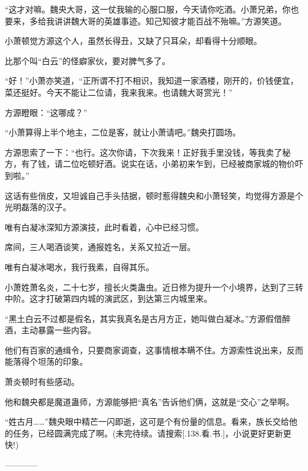 \begin{this_body}
“这才对嘛。魏央大哥，这一仗我输的心服口服，今天请你吃酒。小萧兄弟，你也要来，多给我讲讲魏大哥的英雄事迹。知己知彼才能百战不殆嘛。”方源笑道。

小萧顿觉方源这个人，虽然长得丑，又缺了只耳朵，却看得十分顺眼。

比那个叫“白云”的怪癖家伙，要对脾气多了。

“好！”小萧亦笑道，“正所谓不打不相识，我知道一家酒楼，刚开的，价钱便宜，菜还挺好。今天不能让二位请，我来我来。也请魏大哥赏光！”

方源瞪眼：“这哪成？”

“小萧算得上半个地主，二位是客，就让小萧请吧。”魏央打圆场。

方源思索了一下：“也行。这次你请，下次我来！正好我手里没钱，等我卖了秘方，有了钱，请二位吃顿好酒。说实在话，小弟初来乍到，已经被商家城的物价吓到啦。”

这话有些俏皮，又坦诚自己手头拮据，顿时惹得魏央和小萧轻笑，均觉得方源是个光明磊落的汉子。

唯有白凝冰深知方源演技，此时看着，心中已经习惯。

席间，三人喝酒谈笑，通报姓名，关系又拉近一层。

唯有白凝冰喝水，我行我素，自得其乐。

小萧姓萧名炎，二十七岁，擅长火类蛊虫。近日修为提升一个小境界，达到了三转中阶。这才打破第四内城的演武区，到达第三内城里来。

“黑土白云不过都是假名，其实我真名是古月方正，她叫做白凝冰。”方源假借醉酒，主动暴露一些内容。

他们有百家的通缉令，只要商家调查，这事情根本瞒不住。方源索性说出来，反而能落得个坦荡的印象。

萧炎顿时有些感动。

他和魏央都是魔道蛊师，方源能够把“真名”告诉他们俩，这就是“交心”之举啊。

“姓古月……”魏央眼中精芒一闪即逝，这可是个有份量的信息。看来，族长交给他的任务，已经圆满完成了啊。(未完待续。请搜索[.138.看.书.]，小说更好更新更快!)

------------

\end{this_body}

